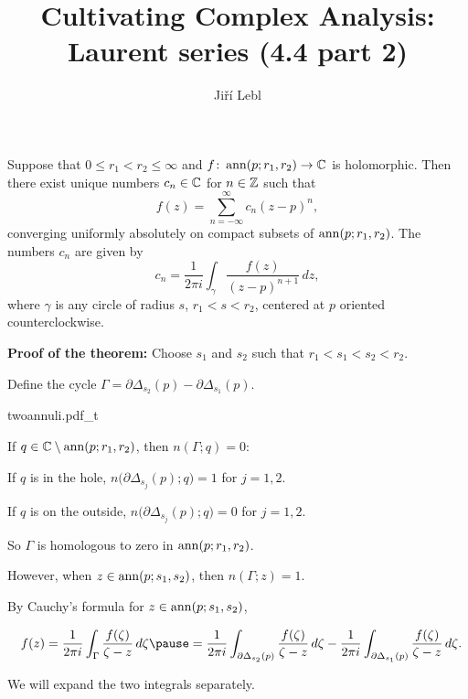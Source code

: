 \documentclass[10pt,aspectratio=169]{beamer}
\author{Ji\v{r}\'i Lebl}
\institute[OSU]{%
Departemento pri Matematiko de Oklahoma {\^S}tata Universitato}
\title{Cultivating Complex Analysis:\\%
Laurent series (4.4 part 2)}
\date{}
\begin{document}
\begin{frame}
\titlepage
\end{frame}

\begin{frame}
\begin{theorem}
Suppose that $0 \leq r_1 < r_2 \leq \infty$ and
$f \colon \operatorname{ann}(p;r_1,r_2) \to {\mathbb{C}}$ is holomorphic.
\pause
Then there exist unique numbers $c_n \in {\mathbb{C}}$ for $n \in {\mathbb{Z}}$ such that
\[
f(z) = \sum_{n=-\infty}^{\infty} c_n {(z-p)}^n ,
\]
converging uniformly absolutely on compact subsets of
$\operatorname{ann}(p;r_1,r_2)$.
\pause
The numbers $c_n$ are given by
\[
c_n = 
\frac{1}{2\pi i}
\int_{\gamma}
\frac{f(z)}{{(z-p)}^{n+1}}
\,
dz  ,
\]
where $\gamma$ is any circle of radius $s$, $r_1 < s < r_2$, centered at
$p$ oriented counterclockwise.
\end{theorem}
\end{frame}

\begin{frame}

\textbf{Proof of the theorem:}
Choose $s_1$ and $s_2$ such that $r_1 < s_1 < s_2 < r_2$.

\medskip
\pause

Define the cycle
\qquad $\Gamma = \partial \Delta_{s_2}(p) - \partial \Delta_{s_1}(p)$.

\vspace*{-0.2in}
\hspace*{3.7in}%
{twoannuli.pdf_t}

\vspace*{-1.45in}

\pause
If $q \in {\mathbb{C}} \setminus \operatorname{ann}(p;r_1,r_2)$, then $n(\Gamma;q) = 0$:

\medskip
\pause

If $q$ is in the hole,
$n\bigl(\partial \Delta_{s_j}(p);q\bigr) = 1$ for $j=1,2$.


\medskip
\pause

If $q$ is on the outside,
$n\bigl(\partial \Delta_{s_j}(p);q\bigr) = 0$ for $j=1,2$.

\medskip
\pause

So $\Gamma$ is homologous to zero in $\operatorname{ann}(p;r_1,r_2)$.


\medskip
\pause

However, when $z \in \operatorname{ann}(p;s_1,s_2)$, then $n(\Gamma;z) = 1$.

\medskip
\pause

By Cauchy's formula for $z \in \operatorname{ann}(p;s_1,s_2)$,

\medskip
$\displaystyle
\quad
f(z) = 
\frac{1}{2\pi i}
\int_{\Gamma} \frac{f(\zeta)}{\zeta-z} \, d\zeta 
\pause
=
\frac{1}{2\pi i}
\int_{\partial \Delta_{s_2}(p)} \frac{f(\zeta)}{\zeta-z} \, d\zeta 
-
\frac{1}{2\pi i}
\int_{\partial \Delta_{s_1}(p)} \frac{f(\zeta)}{\zeta-z} \, d\zeta  .
$
\medskip
\pause

We will expand the two integrals separately.
\end{frame}
\end{document}
